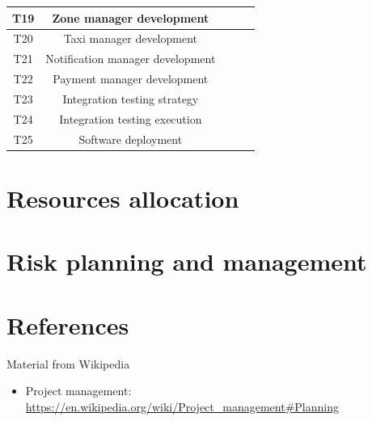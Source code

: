 \documentclass[a4paper,11pt]{report} %
\begin{document}
\begin{center}
{\begin{minipage}{\textwidth}
\begin{tabular}{| c | c | c | c | c |}
				\multicolumn{1}{|c|}{T19} & \multicolumn{1}{|c|}{Zone manager development} & \multicolumn{1}{|c|}{} & \multicolumn{1}{|c|}{} & \multicolumn{1}{|c|}{}\\\hline	
				
				\multicolumn{1}{|c|}{T20} & \multicolumn{1}{|c|}{Taxi manager development} & \multicolumn{1}{|c|}{} & \multicolumn{1}{|c|}{} & \multicolumn{1}{|c|}{}\\\hline	
				
				\multicolumn{1}{|c|}{T21} & \multicolumn{1}{|c|}{Notification manager development} & \multicolumn{1}{|c|}{} & \multicolumn{1}{|c|}{} & \multicolumn{1}{|c|}{}\\\hline	
				
				\multicolumn{1}{|c|}{T22} & \multicolumn{1}{|c|}{Payment manager development} & \multicolumn{1}{|c|}{} & \multicolumn{1}{|c|}{} & \multicolumn{1}{|c|}{}\\\hline	
				
				\multicolumn{1}{|c|}{T23} & \multicolumn{1}{|c|}{Integration testing strategy} & \multicolumn{1}{|c|}{} & \multicolumn{1}{|c|}{} & \multicolumn{1}{|c|}{}\\\hline	
				
				\multicolumn{1}{|c|}{T24} & \multicolumn{1}{|c|}{Integration testing execution} & \multicolumn{1}{|c|}{} & \multicolumn{1}{|c|}{} & \multicolumn{1}{|c|}{}\\\hline	
				
				\multicolumn{1}{|c|}{T25} & \multicolumn{1}{|c|}{Software deployment} & \multicolumn{1}{|c|}{} & \multicolumn{1}{|c|}{} & \multicolumn{1}{|c|}{}\\\hline	
				
								
				

			\end{tabular}
		\end{minipage} }
		
		\end{center}
	
	\section{Resources allocation}	
	
	\section{Risk planning and management}	

	\pagebreak
	\section{References}
		Material from Wikipedia
		\begin{itemize}
			\item Project management: \href{https://en.wikipedia.org/wiki/Project\_management\#Planning}{https://en.wikipedia.org/wiki/Project\_management\#Planning}
		\end{itemize}
	
\end{document}

